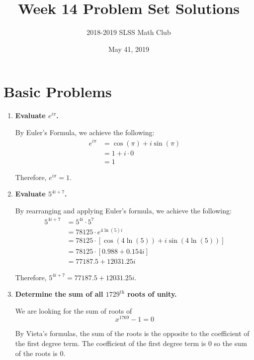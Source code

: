\documentclass[12pt]{article}
\title{Week 14 Problem Set Solutions\vspace{-3mm}}
\author{2018-2019 SLSS Math Club\vspace{-5mm}}
\date{May 41, 2019\vspace{-5mm}}
\begin{document}
\maketitle

\section*{Basic Problems}
\begin{enumerate}
    \item \textbf{Evaluate $e^{i\pi}$.}
    
    By Euler's Formula, we achieve the following:
    \begin{align*}
        e^{i\pi} &= \cos{(\pi)} + i \sin{(\pi)} \\
        &= 1 + i \cdot 0 \\
        &= 1
    \end{align*}

    Therefore, $e^{i\pi} = 1$.
    
    \item \textbf{Evaluate $5^{4i + 7}$.}
    
    By rearranging and applying Euler's formula, we achieve the following:
    \begin{align*}
        5^{4i + 7} &= 5^{4i} \cdot 5^{7} \\
        &= 78125 \cdot e^{4\ln{(5)} i} \\
        &= 78125 \cdot [\cos{(4\ln{(5)})} + i\sin{(4\ln{(5)})}] \\
        &= 78125 \cdot [0.988 + 0.154i] \\
        &= 77187.5 + 12031.25i
    \end{align*}
    
    Therefore, $5^{4i + 7} = 77187.5 + 12031.25i$.
    
    \item \textbf{Determine the sum of all $1729^{\text{th}}$ roots of unity.}
    
    We are looking for the sum of roots of
    \begin{equation*}
        x^{1769} - 1 = 0
    \end{equation*}
    
    By Vieta's formulas, the sum of the roots is the opposite to the coefficient of the first degree term. The coefficient of the first degree term is $0$ so the sum of the roots is $0$.
    
\end{enumerate}
\end{document}
